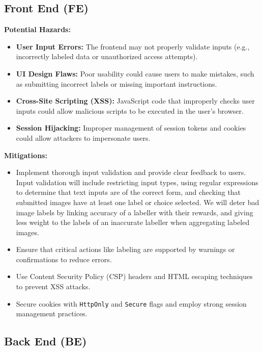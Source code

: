 \documentclass{article}
\begin{document}
\subsection{Front End (FE)}
\textbf{Potential Hazards:}
\begin{itemize}
    \item \textbf{User Input Errors:} The frontend may not properly validate inputs (e.g., incorrectly labeled data or unauthorized access attempts).
    \item \textbf{UI Design Flaws:} Poor usability could cause users to make mistakes, such as submitting incorrect labels or missing important instructions.
    \item \textbf{Cross-Site Scripting (XSS):} JavaScript code that improperly checks user inputs could allow malicious scripts to be executed in the user's browser.
    \item \textbf{Session Hijacking:} Improper management of session tokens and cookies could allow attackers to impersonate users.
\end{itemize}
\textbf{Mitigations:}
\begin{itemize}
    \item Implement thorough input validation and provide clear feedback to users. 
    Input validation will include restricting input types, using regular expressions to determine that text inputs are of the correct form, and checking that submitted images have at least one label or choice selected. 
    We will deter bad image labels by linking accuracy of a labeller with their rewards, and giving less weight to the labels of an inaccurate labeller when aggregating labeled images.
    \item Ensure that critical actions like labeling are supported by warnings or confirmations to reduce errors.
    \item Use Content Security Policy (CSP) headers and HTML escaping techniques to prevent XSS attacks.
    \item Secure cookies with \texttt{HttpOnly} and \texttt{Secure} flags and employ strong session management practices.
\end{itemize}

\subsection{Back End (BE)}
\end{document}
